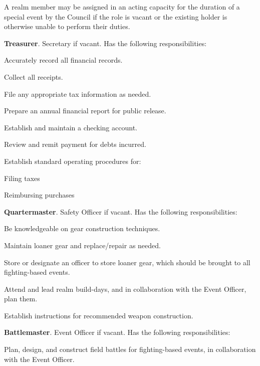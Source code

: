 \documentclass[12pt]{article}
\begin{document}
\begin{level}
\begin{level}
    \item A realm member may be assigned in an acting capacity for the duration of a special event by the Council if the role is vacant or the existing holder is otherwise unable to perform their duties.
    \item \textbf{Treasurer}. Secretary if vacant. Has the following responsibilities:
    \begin{level}
        \item Accurately record all financial records.
        \item Collect all receipts.
        \item File any appropriate tax information as needed.
        \item Prepare an annual financial report for public release.
        \item Establish and maintain a checking account.
        \item Review and remit payment for debts incurred.
        \item Establish standard operating procedures for:
        \begin{level}
            \item Filing taxes
            \item Reimbursing purchases
        \end{level}
    \end{level}
    \item \textbf{Quartermaster}. Safety Officer if vacant. Has the following responsibilities:
    \begin{level}
        \item Be knowledgeable on gear construction techniques.
        \item Maintain loaner gear and replace/repair as needed.
        \item Store or designate an officer to store loaner gear, which should be brought to all fighting-based events.
        \item Attend and lead realm build-days, and in collaboration with the Event Officer, plan them.
        \item Establish instructions for recommended weapon construction.
    \end{level}
    \item \textbf{Battlemaster}. Event Officer if vacant. Has the following responsibilities:
    \begin{level}
        \item Plan, design, and construct field battles for fighting-based events, in collaboration with the Event Officer.

\end{level}
\end{level}
\end{level}
\end{document}
